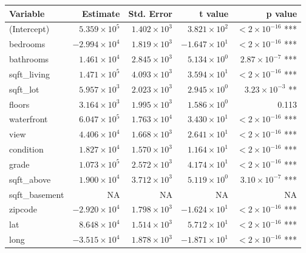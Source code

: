 \documentclass[a4paper, 11pt]{article}
\begin{document}
\begin{table}[ht]
\centering
\begin{tabular}{|l|r|r|r|r|}
\hline
\textbf{Variable} & \textbf{Estimate} & \textbf{Std. Error} & \textbf{t value} & \textbf{p value} \\
\hline
(Intercept)       & $5.359 \times 10^{5}$  & $1.402 \times 10^{3}$  & $3.821 \times 10^{2}$  & $< 2 \times 10^{-16}$ ***  \\
bedrooms          & $-2.994 \times 10^{4}$ & $1.819 \times 10^{3}$  & $-1.647 \times 10^{1}$ & $< 2 \times 10^{-16}$ ***  \\
bathrooms         & $1.461 \times 10^{4}$  & $2.845 \times 10^{3}$  & $5.134 \times 10^{0}$  & $2.87 \times 10^{-7}$ ***   \\
sqft\_living      & $1.471 \times 10^{5}$  & $4.093 \times 10^{3}$  & $3.594 \times 10^{1}$  & $< 2 \times 10^{-16}$ ***  \\
sqft\_lot         & $5.957 \times 10^{3}$  & $2.023 \times 10^{3}$  & $2.945 \times 10^{0}$  & $3.23 \times 10^{-3}$ **    \\
floors            & $3.164 \times 10^{3}$  & $1.995 \times 10^{3}$  & $1.586 \times 10^{0}$  & 0.113          \\
waterfront        & $6.047 \times 10^{5}$  & $1.763 \times 10^{4}$  & $3.430 \times 10^{1}$  & $< 2 \times 10^{-16}$ ***  \\
view              & $4.406 \times 10^{4}$  & $1.668 \times 10^{3}$  & $2.641 \times 10^{1}$  & $< 2 \times 10^{-16}$ ***  \\
condition         & $1.827 \times 10^{4}$  & $1.570 \times 10^{3}$  & $1.164 \times 10^{1}$  & $< 2 \times 10^{-16}$ ***  \\
grade             & $1.073 \times 10^{5}$  & $2.572 \times 10^{3}$  & $4.174 \times 10^{1}$  & $< 2 \times 10^{-16}$ ***  \\
sqft\_above       & $1.900 \times 10^{4}$  & $3.712 \times 10^{3}$  & $5.119 \times 10^{0}$  & $3.10 \times 10^{-7}$ ***   \\
sqft\_basement    & NA          & NA         & NA         & NA             \\
zipcode           & $-2.920 \times 10^{4}$ & $1.798 \times 10^{3}$  & $-1.624 \times 10^{1}$ & $< 2 \times 10^{-16}$ ***  \\
lat               & $8.648 \times 10^{4}$  & $1.514 \times 10^{3}$  & $5.712 \times 10^{1}$  & $< 2 \times 10^{-16}$ ***  \\
long              & $-3.515 \times 10^{4}$ & $1.878 \times 10^{3}$  & $-1.871 \times 10^{1}$ & $< 2 \times 10^{-16}$ ***  \\

\end{tabular}
\end{table}
\end{document}

